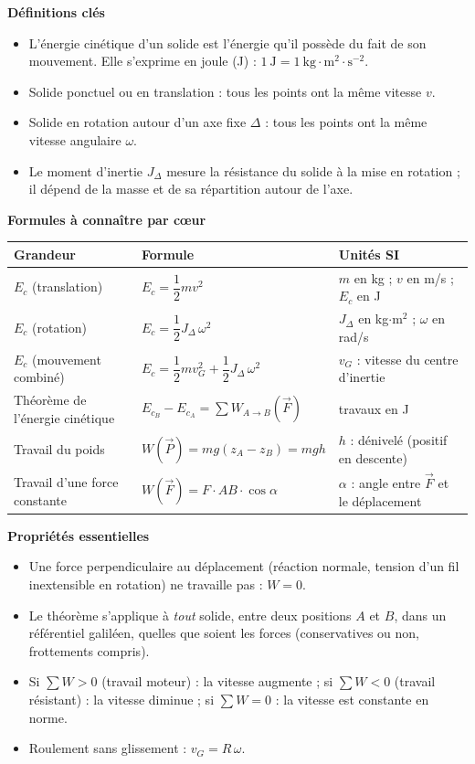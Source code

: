\documentclass[11pt]{article}
\newcommand{\cle}[1]{{\popxbold\color{popdark}#1}}
\begin{document}
\begin{bilan}
\textbf{Définitions clés}
\begin{itemize}
\item L'\cle{énergie cinétique} d'un solide est l'énergie qu'il possède du fait de son mouvement. Elle s'exprime en \cle{joule} (J) : $1~\mathrm{J}=1~\mathrm{kg}\cdot\mathrm{m}^2\cdot\mathrm{s}^{-2}$.
\item Solide ponctuel ou en \cle{translation} : tous les points ont la même vitesse $v$.
\item Solide en \cle{rotation} autour d'un axe fixe $\Delta$ : tous les points ont la même vitesse angulaire $\omega$.
\item Le \cle{moment d'inertie} $J_\Delta$ mesure la résistance du solide à la mise en rotation ; il dépend de la masse et de sa répartition autour de l'axe.
\end{itemize}

\textbf{Formules à connaître par c\oe ur}
\begin{center}
\begin{tabularx}{\linewidth}{|l|X|X|}
\hline
\rowcolor{popblueL} \textbf{Grandeur} & \textbf{Formule} & \textbf{Unités SI} \\
\hline
$E_c$ (translation) & $E_c=\dfrac{1}{2}mv^2$ & $m$ en kg ; $v$ en m/s ; $E_c$ en J \\
\hline
$E_c$ (rotation) & $E_c=\dfrac{1}{2}J_\Delta\,\omega^2$ & $J_\Delta$ en kg$\cdot$m$^2$ ; $\omega$ en rad/s \\
\hline
$E_c$ (mouvement combiné) & $E_c=\dfrac{1}{2}mv_G^2+\dfrac{1}{2}J_\Delta\,\omega^2$ & $v_G$ : vitesse du centre d'inertie \\
\hline
Théorème de l'énergie cinétique & $E_{c_B}-E_{c_A}=\displaystyle\sum W_{A\to B}(\vec{F})$ & travaux en J \\
\hline
Travail du poids & $W(\vec{P})=mg(z_A-z_B)=mgh$ & $h$ : dénivelé (positif en descente) \\
\hline
Travail d'une force constante & $W(\vec{F})=F\cdot AB\cdot\cos\alpha$ & $\alpha$ : angle entre $\vec{F}$ et le déplacement \\
\hline
\end{tabularx}
\end{center}

\textbf{Propriétés essentielles}
\begin{itemize}
\item Une force \cle{perpendiculaire} au déplacement (réaction normale, tension d'un fil inextensible en rotation) ne travaille pas : $W=0$.
\item Le théorème s'applique à \emph{tout} solide, entre deux positions $A$ et $B$, dans un référentiel galiléen, quelles que soient les forces (conservatives ou non, frottements compris).
\item Si $\sum W>0$ (travail moteur) : la vitesse augmente ; si $\sum W<0$ (travail résistant) : la vitesse diminue ; si $\sum W=0$ : la vitesse est constante en norme.
\item Roulement sans glissement : $v_G=R\,\omega$.
\end{itemize}


\end{bilan}
\end{document}
